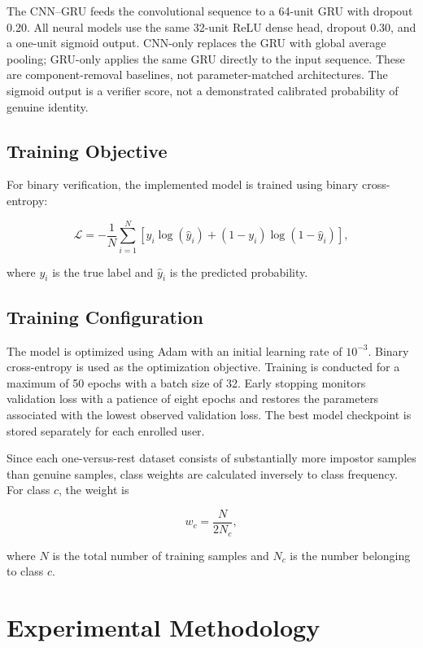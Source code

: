 \documentclass[conference]{IEEEtran}
\begin{document}
The CNN--GRU feeds the convolutional sequence to a 64-unit GRU with dropout
0.20. All neural models use the same 32-unit ReLU dense head, dropout 0.30,
and a one-unit sigmoid output. CNN-only replaces the GRU with global average
pooling; GRU-only applies the same GRU directly to the input sequence.
These are component-removal baselines, not parameter-matched architectures.
The sigmoid output is a verifier score, not a demonstrated calibrated
probability of genuine identity.

\subsection{Training Objective}

For binary verification, the implemented model is trained using binary cross-entropy:

\begin{equation}
\mathcal{L}
=
-
\frac{1}{N}
\sum_{i=1}^{N}
\left[
y_i\log(\hat{y}_i)
+
(1-y_i)\log(1-\hat{y}_i)
\right],
\label{eq:bce_loss}
\end{equation}

where $y_i$ is the true label and $\hat{y}_i$ is the predicted probability.

\subsection{Training Configuration}

The model is optimized using Adam with an initial learning rate of $10^{-3}$. Binary cross-entropy is used as the optimization objective. Training is conducted for a maximum of 50 epochs with a batch size of 32. Early stopping monitors validation loss with a patience of eight epochs and restores the parameters associated with the lowest observed validation loss. The best model checkpoint is stored separately for each enrolled user.

Since each one-versus-rest dataset consists of substantially more impostor samples than genuine samples, class weights are calculated inversely to class frequency. For class $c$, the weight is

\begin{equation}
w_c
=
\frac{N}{2N_c},
\label{eq:class_weight}
\end{equation}

where $N$ is the total number of training samples and $N_c$ is the number
belonging to class $c$.

\section{Experimental Methodology}
\end{document}
